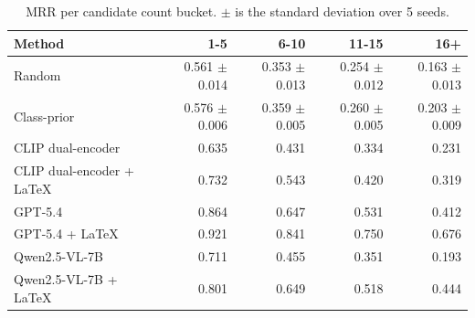 \begin{table}[t]
\centering
\caption{MRR per candidate count bucket. $\pm$ is the standard deviation over 5 seeds.}
\label{tab:bd_candidate_count_mrr}
\begin{tabular}{lrrrr}
\toprule
Method & 1-5 & 6-10 & 11-15 & 16+ \\
\midrule
Random & 0.561 $\pm$ 0.014 & 0.353 $\pm$ 0.013 & 0.254 $\pm$ 0.012 & 0.163 $\pm$ 0.013 \\
Class-prior & 0.576 $\pm$ 0.006 & 0.359 $\pm$ 0.005 & 0.260 $\pm$ 0.005 & 0.203 $\pm$ 0.009 \\
CLIP dual-encoder & 0.635 & 0.431 & 0.334 & 0.231 \\
CLIP dual-encoder + LaTeX & 0.732 & 0.543 & 0.420 & 0.319 \\
GPT-5.4 & 0.864 & 0.647 & 0.531 & 0.412 \\
GPT-5.4 + LaTeX & 0.921 & 0.841 & 0.750 & 0.676 \\
Qwen2.5-VL-7B & 0.711 & 0.455 & 0.351 & 0.193 \\
Qwen2.5-VL-7B + LaTeX & 0.801 & 0.649 & 0.518 & 0.444 \\
\bottomrule
\end{tabular}
\end{table}

